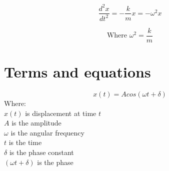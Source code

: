   \begin{equation*}
    \frac{d^2x}{dt^2} = - \frac{k}{m}x = - \omega^2x
  \end{equation*}

  \begin{equation*}
    {\text{Where } \omega^2 = \frac{k}{m}}
  \end{equation*}
  
  \section*{Terms and equations}
  \begin{mdframed}[  linecolor=red,  border color  backgroundcolor=yellow,
     background color  linewidth=2pt,
      line width  innerleftmargin=10pt,
       left padding  innerrightmargin=10pt,
        right padding  innertopmargin=10pt,
         top padding  innerbottommargin=10pt
          bottom padding]
    \begin{equation*}
      x(t) = Acos(\omega t + \delta)
    \end{equation*}
    Where:\\
    $x(t)$ is displacement at time $t$\\
    $A$ is the amplitude\\
    $\omega$ is the angular frequency\\
    $t$ is the time\\
    $\delta$ is the phase constant\\
    $(\omega t + \delta)$ is the phase
  \end{mdframed}


